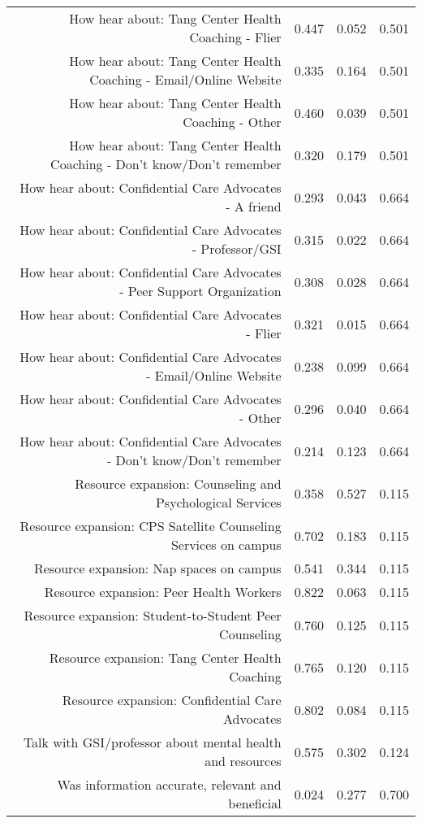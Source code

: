 \documentclass{article}\usepackage[]{graphicx}\usepackage[]{color}
\begin{document}
\begin{table}[ht]
\begin{tabular}{rrrr}
  How hear about: Tang Center Health Coaching - Flier & 0.447 & 0.052 & 0.501 \\ 
  How hear about: Tang Center Health Coaching - Email/Online Website & 0.335 & 0.164 & 0.501 \\ 
  How hear about: Tang Center Health Coaching - Other & 0.460 & 0.039 & 0.501 \\ 
  How hear about: Tang Center Health Coaching - Don't know/Don't remember & 0.320 & 0.179 & 0.501 \\ 
  How hear about: Confidential Care Advocates - A friend & 0.293 & 0.043 & 0.664 \\ 
  How hear about: Confidential Care Advocates - Professor/GSI & 0.315 & 0.022 & 0.664 \\ 
  How hear about: Confidential Care Advocates - Peer Support Organization & 0.308 & 0.028 & 0.664 \\ 
  How hear about: Confidential Care Advocates - Flier & 0.321 & 0.015 & 0.664 \\ 
  How hear about: Confidential Care Advocates - Email/Online Website & 0.238 & 0.099 & 0.664 \\ 
  How hear about: Confidential Care Advocates - Other & 0.296 & 0.040 & 0.664 \\ 
  How hear about: Confidential Care Advocates - Don't know/Don't remember & 0.214 & 0.123 & 0.664 \\ 
  Resource expansion: Counseling and Psychological Services & 0.358 & 0.527 & 0.115 \\ 
  Resource expansion: CPS Satellite Counseling Services on campus & 0.702 & 0.183 & 0.115 \\ 
  Resource expansion: Nap spaces on campus & 0.541 & 0.344 & 0.115 \\ 
  Resource expansion: Peer Health Workers & 0.822 & 0.063 & 0.115 \\ 
  Resource expansion: Student-to-Student Peer Counseling & 0.760 & 0.125 & 0.115 \\ 
  Resource expansion: Tang Center Health Coaching & 0.765 & 0.120 & 0.115 \\ 
  Resource expansion: Confidential Care Advocates & 0.802 & 0.084 & 0.115 \\ 
  Talk with GSI/professor about mental health and resources & 0.575 & 0.302 & 0.124 \\ 
  Was information accurate, relevant and beneficial & 0.024 & 0.277 & 0.700 \\ 
   \hline
\end{tabular}
\end{table}
\end{document}
